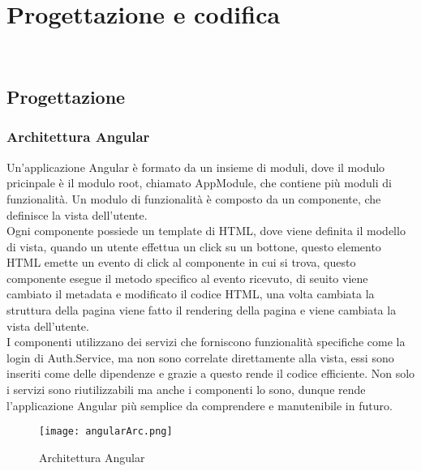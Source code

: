 
\chapter{Progettazione e codifica}
\label{cap:progettazione e codifica}

\\

\section{Progettazione}
\subsection{Architettura Angular}
Un'applicazione Angular è formato da un insieme di moduli, dove il modulo pricinpale è il modulo root, chiamato AppModule, che contiene più moduli di funzionalità. Un modulo di funzionalità è composto da un componente, che definisce la vista dell'utente.\\
Ogni componente possiede un template di HTML, dove viene definita il modello di vista, quando un utente effettua un click su un bottone, questo elemento HTML emette un evento di click al componente in cui si trova, questo componente esegue il metodo specifico al evento ricevuto, di seuito viene cambiato il metadata e modificato il codice HTML, una volta cambiata la struttura della pagina viene fatto il rendering della pagina e viene cambiata la vista dell'utente.\\
I componenti utilizzano dei servizi che forniscono funzionalità specifiche come la login di Auth.Service, ma non sono correlate direttamente alla vista, essi sono inseriti come delle dipendenze e grazie a questo rende il codice efficiente. Non solo i servizi sono riutilizzabili ma anche i componenti lo sono, dunque rende l'applicazione Angular più semplice da comprendere e manutenibile in futuro.\\
\begin{figure}[H]
    \centering
    \texttt{[image: angularArc.png]}
    \caption{Architettura Angular}
\end{figure}
